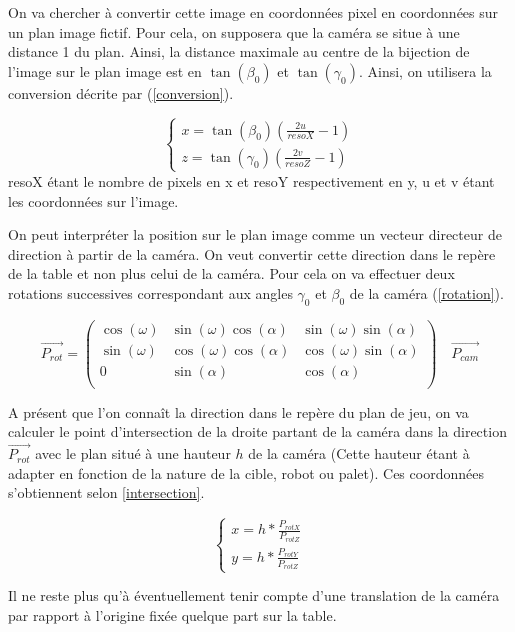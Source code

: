 \documentclass{article}
\begin{document}
On va chercher à convertir cette image en coordonnées pixel en coordonnées sur un plan image fictif. Pour cela, on supposera que la caméra se situe à une distance 1 du plan. Ainsi, la distance maximale au centre de la bijection de l'image sur le plan image est en $\tan(\beta_0)$ et $\tan(\gamma_0)$. Ainsi, on utilisera la conversion décrite par (\ref{conversion}).

\begin{equation}
\label{conversion}
\left\{
    \begin{array}{ll}
        x = \tan(\beta_0)(\frac{2u}{resoX}-1)\\
        z = \tan(\gamma_0)(\frac{2v}{resoZ} -1)
    \end{array}
\right.
\end{equation}
resoX étant le nombre de pixels en x et resoY respectivement en y, u et v étant les coordonnées sur l'image.

On peut interpréter la position sur le plan image comme un vecteur directeur de direction à partir de la caméra. On veut convertir cette direction dans le repère de la table et non plus celui de la caméra. Pour cela on va effectuer deux rotations successives correspondant aux angles $\gamma_0$ et $\beta_0$ de la caméra (\ref{rotation}).

\begin{equation}
\label{rotation}
\vec{P_{rot}} =
\begin{pmatrix}
\cos(\omega) & \sin(\omega)\cos(\alpha) & \sin(\omega)\sin(\alpha) \\
\sin(\omega) & \cos(\omega)\cos(\alpha) & \cos(\omega)\sin(\alpha)\\
0 & \sin(\alpha) & \cos(\alpha)\\
\end{pmatrix}
\quad
\vec{P_{cam}}
\end{equation}

A présent que l'on connaît la direction dans le repère du plan de jeu, on va calculer le point d'intersection de la droite partant de la caméra dans la direction $\vec{P_{rot}}$ avec le plan situé à une hauteur $h$ de la caméra (Cette hauteur étant à adapter en fonction de la nature de la cible, robot ou palet). Ces coordonnées s'obtiennent selon \ref{intersection}.

\begin{equation}
\label{intersection}
\left\{
    \begin{array}{ll}
        x = h * \frac{P_{rotX}}{P_{rotZ}}\\
        y = h * \frac{P_{rotY}}{P_{rotZ}}
    \end{array}
\right.
\end{equation}

Il ne reste plus qu'à éventuellement tenir compte d'une translation de la caméra par rapport à l'origine fixée quelque part sur la table.
\end{document}
